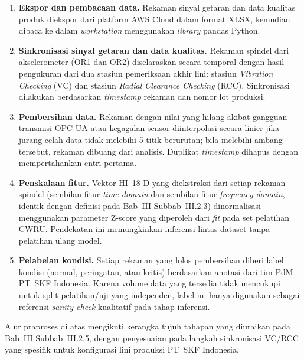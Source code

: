 {\color{blue}
\begin{enumerate}
  \item \textbf{Ekspor dan pembacaan data.} Rekaman sinyal getaran dan data
        kualitas produk diekspor dari platform AWS Cloud dalam format XLSX,
        kemudian dibaca ke dalam \emph{workstation} menggunakan \emph{library}
        pandas Python.
  \item \textbf{Sinkronisasi sinyal getaran dan data kualitas.} Rekaman
        spindel dari akselerometer (OR1 dan OR2) diselaraskan secara temporal
        dengan hasil pengukuran dari dua stasiun pemeriksaan akhir lini:
        stasiun \emph{Vibration Checking} (VC) dan stasiun \emph{Radial
        Clearance Checking} (RCC). Sinkronisasi dilakukan berdasarkan
        \emph{timestamp} rekaman dan nomor lot produksi.
  \item \textbf{Pembersihan data.} Rekaman dengan nilai yang hilang akibat
        gangguan transmisi OPC-UA atau kegagalan sensor diinterpolasi secara
        linier jika jurang celah data tidak melebihi 5 titik berurutan; bila
        melebihi ambang tersebut, rekaman dibuang dari analisis.
        Duplikat \emph{timestamp} dihapus dengan mempertahankan entri pertama.
  \item \textbf{Penskalaan fitur.} Vektor HI~18-D yang diekstraksi dari
        setiap rekaman spindel (sembilan fitur \emph{time-domain} dan
        sembilan fitur \emph{frequency-domain}, identik dengan definisi pada
        Bab~III Subbab~III.2.3) dinormalisasi menggunakan parameter
        Z-score yang diperoleh dari \emph{fit} pada set pelatihan CWRU.
        Pendekatan ini memungkinkan inferensi lintas dataset tanpa pelatihan
        ulang model.
  \item \textbf{Pelabelan kondisi.} Setiap rekaman yang lolos pembersihan
        diberi label kondisi (normal, peringatan, atau kritis) berdasarkan
        anotasi dari tim PdM PT~SKF Indonesia. Karena volume data yang
        tersedia tidak mencukupi untuk split pelatihan/uji yang independen,
        label ini hanya digunakan sebagai referensi \emph{sanity check}
        kualitatif pada tahap inferensi.
\end{enumerate}
}

{\color{blue}Alur praproses di atas mengikuti kerangka tujuh tahapan yang diuraikan
pada Bab~III Subbab~III.2.5, dengan penyesuaian pada langkah sinkronisasi
VC/RCC yang spesifik untuk konfigurasi lini produksi PT~SKF Indonesia.}

